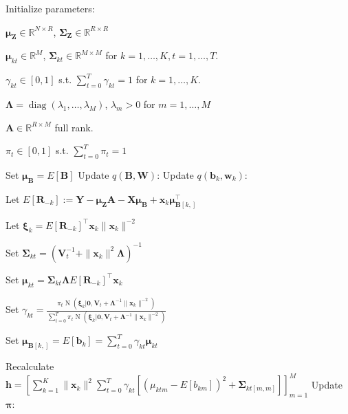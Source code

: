 \documentclass[11pt,authoryear]{article}
\DeclareMathOperator*{\diag}{diag}
\DeclareMathOperator*{\N}{N}
\newcommand{\bs}[1]{\boldsymbol{#1}}
\begin{document}
\begin{algorithm}
\begin{algorithmic}
  \STATE Initialize parameters:
  \begin{description}
  \item $\bs{\mu}_{\bs{Z}} \in \mathbb{R}^{N \times R}$, $\bs{\Sigma}_{\bs{Z}} \in \mathbb{R}^{R \times R}$
  \item $\bs{\mu}_{kt}\in\mathbb{R}^{M}$, $\bs{\Sigma}_{kt} \in \mathbb{R}^{M \times M}$ for $k = 1,\ldots,K, t = 1,\ldots, T$.
  \item $\gamma_{kt} \in [0, 1]$ s.t. $\sum_{t = 0}^T\gamma_{kt} = 1$ for $k = 1,\ldots,K$.
  \item $\bs{\Lambda} = \diag(\lambda_1,\ldots,\lambda_M)$, $\lambda_m > 0$ for $m = 1,\ldots,M$
  \item $\bs{A} \in \mathbb{R}^{R \times M}$ full rank.
  \item $\pi_t \in [0, 1]$ s.t. $\sum_{t = 0}^T\pi_t = 1$
  \end{description}
  \STATE Set $\bs{\mu}_{\bs{B}} = E[\bs{B}]$
  \REPEAT
  \STATE Update $q(\bs{B},\bs{W})$:
  \STATE Update $q(\bs{b}_k,\bs{w}_k)$:
  \begin{description}
  \item Let $E[\bs{R}_{-k}] := \bs{Y} - \bs{\mu}_{\bs{Z}}\bs{A} - \bs{X}\bs{\mu}_{\bs{B}} + \bs{x}_k\bs{\mu}_{\bs{B}[k, ]}^{\intercal}$
  \item Let $\bs{\xi}_k = E\left[\bs{R}_{-k}\right]^{\intercal}\bs{x}_k\|\bs{x}_k\|^{-2}$
  \item Set $\bs{\Sigma}_{kt} = \left(\bs{V}_t^{-1} + \|\bs{x}_k\|^2\bs{\Lambda}\right)^{-1}$
  \item Set $\bs{\mu}_{kt} = \bs{\Sigma}_{kt}\bs{\Lambda}E\left[\bs{R}_{-k}\right]^{\intercal}\bs{x}_k$
  \item Set $\gamma_{kt} = \frac{\pi_t\N(\bs{\xi}_k|\bs{0}, \bs{V}_t + \bs{\Lambda}^{-1}\|\bs{x}_k\|^{-2})}{\sum_{t = 0}^T\pi_t\N(\bs{\xi}_k|\bs{0}, \bs{V}_t + \bs{\Lambda}^{-1}\|\bs{x}_k\|^{-2})}$
    \ENDFOR
  \item Set $\bs{\mu}_{\bs{B}[k, ]} = E[\bs{b}_{k}] = \sum_{t = 0}^T \gamma_{kt}\bs{\mu}_{kt}$
  \end{description}
  \ENDFOR
  \STATE Recalculate $\bs{h} = \left[\sum_{k = 1}^K\|\bs{x}_k\|^2\sum_{t = 0}^T\gamma_{kt}\left[\left(\mu_{ktm} - E[b_{km}]\right)^2 + \bs{\Sigma}_{kt[m, m]}\right]\right]_{m = 1}^{M}$
  \STATE Update $\bs{\pi}$:
  \begin{description}

\end{description}
\end{algorithmic}
\end{algorithm}
\end{document}
